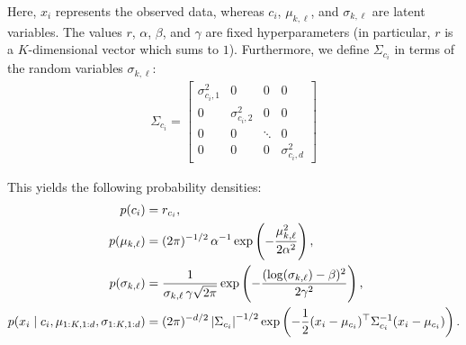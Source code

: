 \documentclass[11pt]{article}
\begin{document}
Here, $x_i$ represents the observed data, whereas $c_i$, $\mu_{k, \ell}$, and $\sigma_{k,\ell}$ are latent variables.
The values $r$, $\alpha$, $\beta$, and $\gamma$ are fixed hyperparameters (in particular, $r$ is a $K$-dimensional vector which sums to $1$).
Furthermore, we define $\Sigma_{c_i}$ in terms of the random variables $\sigma_{k,\ell}$:
\begin{align}
\Sigma_{c_i}
= \begin{bmatrix}
    \sigma_{c_i, 1}^2 & 0 & 0 & 0 \\
    0 & \sigma_{c_i, 2}^2 & 0 & 0 \\
    0 & 0 & \ddots & 0 \\
    0 & 0 & 0 & \sigma_{c_i, d}^2
  \end{bmatrix}
\end{align}

This yields the following probability densities:
\begin{align}
p(c_i) &= r_{c_i}, \\
p(\mu_{k, \ell}) &= (2\pi)^{-1/2} \, \alpha^{-1} \exp\left( -\frac{\mu_{k, \ell}^2}{2 \alpha^2} \right), \\
p(\sigma_{k,\ell}) &= \frac{1}{\sigma_{k,\ell} \, \gamma \sqrt{2\pi}} \exp \left( -\frac{(\log(\sigma_{k,\ell}) - \beta)^2}{2\gamma^2} \right), \\
p(x_i \mid c_i, \mu_{1:K,1:d}, \sigma_{1:K,1:d}) &= (2\pi)^{-d/2} \, \abs{\Sigma_{c_i}}^{-1/2} \exp \left( -\frac{1}{2} (x_i - \mu_{c_i})^\top \Sigma_{c_i}^{-1} (x_i - \mu_{c_i}) \right).
\end{align}
\end{document}
